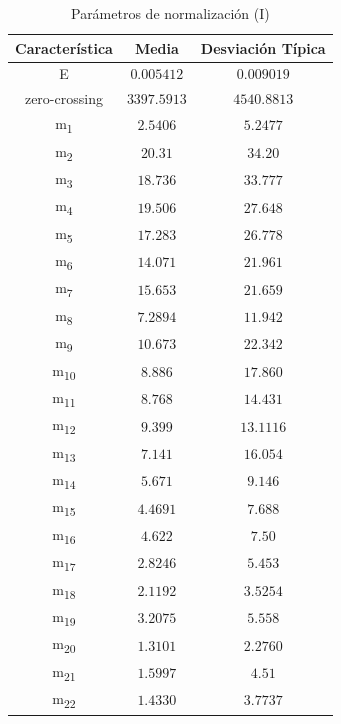 \documentclass[12pt]{article}
\begin{document}
\begin{table}
	\caption{Parámetros de normalización (I)}
	\centering
		\begin{tabular}{||c c c||}
			\hline
			Característica & Media & Desviación Típica  \\ [0.5ex]
			\hline\hline
			E & $0.005412$ & $0.009019$ \\
			\hline
			zero-crossing & $3397.5913$ & $4540.8813$ \\
			\hline
			m\textsubscript{1} & $2.5406$ & $5.2477$ \\
			\hline
			m\textsubscript{2} & $20.31$ & $34.20$ \\
			\hline
			m\textsubscript{3} & $18.736$ & $33.777$ \\
			\hline
			m\textsubscript{4} & $19.506$ & $27.648$ \\
			\hline
			m\textsubscript{5} & $17.283$ & $26.778$ \\
			\hline
			m\textsubscript{6} & $14.071$ & $21.961$ \\
			\hline
			m\textsubscript{7} & $15.653$ & $21.659$ \\
			\hline
			m\textsubscript{8} & $7.2894$ & $11.942$ \\
			\hline
			m\textsubscript{9} & $10.673$ & $22.342$ \\
			\hline
			m\textsubscript{10} & $8.886$ & $17.860$ \\
			\hline
			m\textsubscript{11} & $8.768$ & $14.431$ \\
			\hline
			m\textsubscript{12} & $9.399$ & $13.1116$ \\
			\hline
			m\textsubscript{13} & $7.141$ & $16.054$ \\
			\hline
			m\textsubscript{14} & $5.671$ & $9.146$ \\
			\hline
			m\textsubscript{15} & $4.4691$ & $7.688$ \\
			\hline
			m\textsubscript{16} & $4.622$ & $7.50$ \\
			\hline
			m\textsubscript{17} & $2.8246$ & $5.453$ \\
			\hline
			m\textsubscript{18} & $2.1192$ & $3.5254$ \\
			\hline
			m\textsubscript{19} & $3.2075$ & $5.558$ \\
			\hline
			m\textsubscript{20} & $1.3101$ & $2.2760$ \\
			\hline
			m\textsubscript{21} & $1.5997$ & $4.51$ \\
			\hline
			m\textsubscript{22} & $1.4330$ & $3.7737$ \\

\end{tabular}
\end{table}
\end{document}
